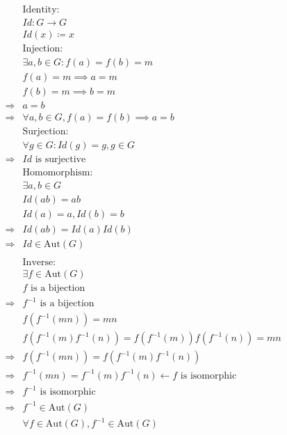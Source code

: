 \documentclass{article}
\begin{document}
\begin{equation*}
    \begin{split}
        &\text{Identity}:\\
        &Id:G\rightarrow G\\
        &Id(x) \coloneqq x\\
        &\text{Injection}:\\
        &\exists a,b\in G:f(a)=f(b)=m\\
        &f(a)=m\implies a=m\\
        &f(b)=m\implies b=m\\
        \Rightarrow&a=b\\
        \Rightarrow&\forall a,b\in G,f(a)=f(b)\implies a=b\\
        &\text{Surjection}:\\
        &\forall g\in G: Id(g)=g,g\in G\\
        \Rightarrow&Id\text{ is surjective}\\
        &\text{Homomorphism}:\\
        &\exists a,b\in G\\
        &Id(ab)=ab\\
        &Id(a)=a,Id(b)=b\\
        \Rightarrow&Id(ab)=Id(a)Id(b)\\
        \Rightarrow&Id\in \text{Aut}(G)\\
        &\\
        &\text{Inverse}:\\
        &\exists f\in\text{Aut}(G)\\
        &f\text{ is a bijection}\\
        \Rightarrow&f^{-1}\text{ is a bijection}\\
        &f(f^{-1}(mn))=mn\\
        &f(f^{-1}(m)f^{-1}(n))=f(f^{-1}(m))f(f^{-1}(n))=mn\\
        \Rightarrow&f(f^{-1}(mn))=f(f^{-1}(m)f^{-1}(n))\\
        \Rightarrow&f^{-1}(mn)=f^{-1}(m)f^{-1}(n)\leftarrow f\text{ is isomorphic}\\
        \Rightarrow&f^{-1}\text{ is isomorphic}\\
        \Rightarrow&f^{-1}\in \text{Aut}(G)\\
        &\forall f\in \text{Aut}(G),f^{-1}\in\text{Aut}(G)\\
    \end{split}
\end{equation*}
\end{document}
